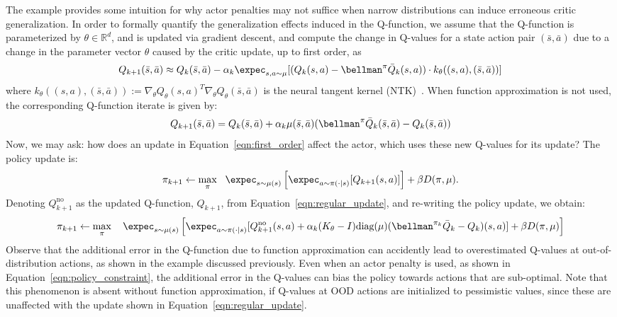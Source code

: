 The example provides some intuition for why actor penalties may not suffice when narrow distributions can induce erroneous critic generalization. In order to formally quantify the generalization effects induced in the Q-function, we assume that the Q-function is parameterized by $\theta \in \mathbb{R}^d$, and is updated via gradient descent, and 
compute the change in Q-values for a state action pair $(\bar{s}, \bar{a})$ due to a change in the parameter vector $\theta$ caused by the critic update, up to first order, as
\begin{equation}
\label{eqn:first_order}
    Q_{k+1}(\bar{s}, \bar{a}) \approx Q_{k}(\bar{s}, \bar{a}) - \alpha_k \expec_{s, a \sim \mu} [(Q_k(s, a) - \bellman^\pi \bar{Q}_k(s, a) ) \cdot k_\theta((s, a), (\bar{s}, \bar{a}))]
\end{equation}
where $k_\theta((s, a), (\bar{s}, \bar{a})) := \nabla_\theta Q_\theta(s, a)^T \nabla_\theta Q_\theta(\bar{s}, \bar{a})$ is the neural tangent kernel (NTK)~\citep{jacot18ntk}. 
When function approximation is not used, the corresponding Q-function iterate is given by:
\begin{equation}
\label{eqn:regular_update}
    Q_{k+1}(\bar{s}, \bar{a}) = Q_k(\bar{s}, \bar{a}) + \alpha_k \mu(\bar{s}, \bar{a}) (\bellman^\pi \bar{Q}_k(\bar{s}, \bar{a}) - Q_k(\bar{s}, \bar{a}))
\end{equation}
Now, we may ask: how does an update in Equation~\ref{eqn:first_order} affect the actor, which uses these new Q-values for its update? The policy update is:
\begin{equation}
\label{eqn:policy_constraint}
    \pi_{k+1} \leftarrow \max_{\pi}~~ \expec_{s \sim \mu(s)}\left[\expec_{a \sim \pi(\cdot|s)} [Q_{k+1}(s, a)] \right] + \beta D(\pi, \mu).
\end{equation}
Denoting $Q_{k+1}^{\text{no}}$ as the updated Q-function, $Q_{k+1}$, from Equation~\ref{eqn:regular_update}, and re-writing the policy update, we obtain:
\begin{equation}
    \pi_{k+1} \leftarrow \max_{\pi}~~~ \expec_{s \sim \mu(s)} \left[\expec_{a \sim \pi(\cdot|s)}[Q_{k+1}^{\text{no}}(s, a) + \alpha_k (K_\theta - I) \text{diag}(\mu) (\bellman^{\pi_k}\bar{Q}_k - Q_k)(s, a)] + \beta D(\pi, \mu) \right]
\end{equation}
Observe that the additional error in the Q-function due to function approximation can accidently lead to overestimated Q-values at out-of-distribution actions, as shown in the example discussed previously. Even when an actor penalty is used, as shown in Equation~\ref{eqn:policy_constraint}, the additional error in the Q-values can bias the policy towards actions that are sub-optimal. Note that this phenomenon is absent without function approximation, if Q-values at OOD actions are initialized to pessimistic values, since these are unaffected with the update shown in Equation~\ref{eqn:regular_update}. 

